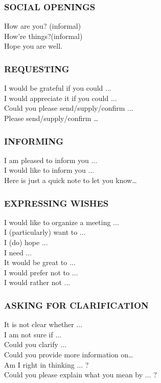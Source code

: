 \subsubsection{SOCIAL OPENINGS}
How are you? (informal)\\
How're things?(informal)\\
Hope you are well.\\
\subsubsection{REQUESTING}
I would be grateful if you could ...\\
I would appreciate it if you could ...\\
Could you please send/supply/confirm ...\\
Please send/supply/confirm …\\
\subsubsection{INFORMING}
I am pleased to inform you ...\\
I would like to inform you ...\\
Here is just a quick note to let you know…\\
\subsubsection{EXPRESSING WISHES}
I would like to organize a meeting ...\\
I (particularly) want to ...\\
I (do) hope ...\\
I need ...\\
It would be great to ...\\
I would prefer not to ...\\
I would rather not ...\\
\subsubsection{ASKING FOR CLARIFICATION}
It is not clear whether ...\\
I am not sure if ...\\
Could you clarify ...\\
Could you provide more information on…\\
Am I right in thinking ... ?\\
Could you please explain what you mean by ... ?\\
